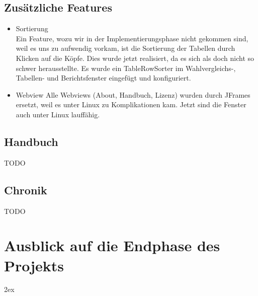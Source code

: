 \documentclass[12pt,a4paper,titlepage]{article}
\begin{document}
\subsection{Zusätzliche Features}
\begin{itemize}
\item{Sortierung}\\
Ein Feature, wozu wir in der Implementierungsphase nicht gekommen sind, weil es uns zu aufwendig vorkam, ist die Sortierung der Tabellen durch Klicken auf die Köpfe. Dies wurde jetzt realisiert, da es sich als doch nicht so schwer herausstellte. Es wurde ein TableRowSorter im Wahlvergleichs-, Tabellen- und Berichtsfenster eingefügt und konfiguriert.\\

\item{Webview}
Alle Webviews (About, Handbuch, Lizenz) wurden durch JFrames ersetzt, weil es unter Linux zu Komplikationen kam. Jetzt sind die Fenster auch unter Linux lauffähig.\\

\end{itemize}

\subsection{Handbuch}
TODO

\subsection{Chronik}
TODO

\section{Ausblick auf die Endphase des Projekts}


\begingroup
\parindent 0pt
\parskip 2ex
\def\enotesize{\normalsize}

\endgroup
\end{document}
